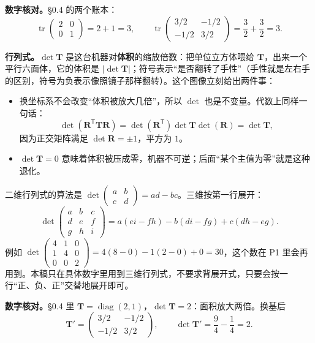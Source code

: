 \documentclass[11pt]{ctexart}
\newcommand{\ten}[1]{\mathbf{#1}}
\newcommand{\tr}{\operatorname{tr}}
\begin{document}
\textbf{数字核对。}§0.4 的两个账本：
\[
\tr\begin{pmatrix}2&0\\0&1\end{pmatrix}=2+1=3,
\qquad
\tr\begin{pmatrix}3/2&-1/2\\-1/2&3/2\end{pmatrix}=\frac32+\frac32=3 .
\]

\textbf{行列式。}$\det\ten T$ 是这台机器对\textbf{体积}的缩放倍数：把单位立方体喂给 $\ten T$，出来一个平行六面体，它的体积是 $|\det\ten T|$；符号表示“是否翻转了手性”（手性就是左右手的区别，符号为负表示像照镜子那样翻转）。这个图像立刻给出两件事：
\begin{itemize}
\item 换坐标系不会改变“体积被放大几倍”，所以 $\det$ 也是不变量。代数上同样一句话：
\[
\det(\ten R^{\mathsf T}\ten T\ten R)=\det(\ten R^{\mathsf T})\det\ten T\det(\ten R)=\det\ten T,
\]
因为正交矩阵满足 $\det\ten R=\pm1$，平方为 $1$。
\item $\det\ten T=0$ 意味着体积被压成零，机器不可逆；后面“某个主值为零”就是这种退化。
\end{itemize}
二维行列式的算法是 $\det\begin{pmatrix}a&b\\c&d\end{pmatrix}=ad-bc$。三维按第一行展开：
\[
\det\begin{pmatrix}a&b&c\\d&e&f\\g&h&i\end{pmatrix}
=a(ei-fh)-b(di-fg)+c(dh-eg).
\]
例如 $\det\begin{pmatrix}4&1&0\\1&4&0\\0&0&2\end{pmatrix}
=4(8-0)-1(2-0)+0=30$，这个数在 P1 里会再用到。本稿只在具体数字里用到三维行列式，不要求背展开式，只要会按一行“正、负、正”交替地展开即可。

\textbf{数字核对。}§0.4 里 $\ten T=\operatorname{diag}(2,1)$，$\det\ten T=2$：面积放大两倍。换基后
\[
\ten T'=\begin{pmatrix}3/2&-1/2\\-1/2&3/2\end{pmatrix},
\qquad
\det\ten T'=\frac94-\frac14=2 .
\]
\end{document}
